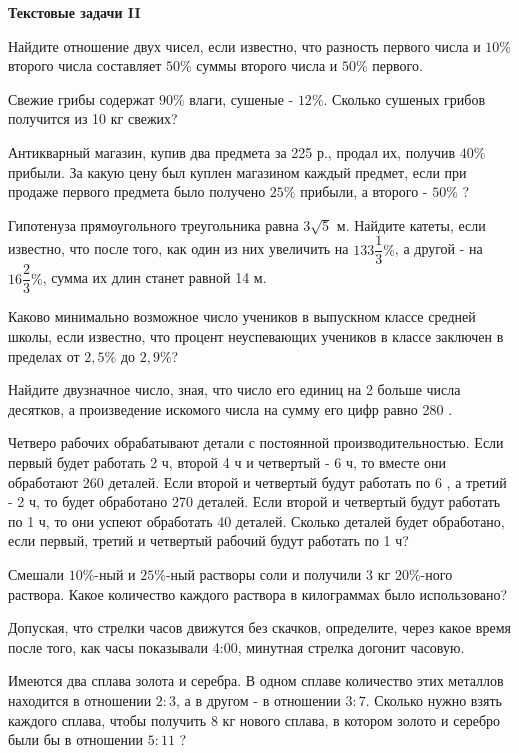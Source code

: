 \centerline{\bf \Huge Текстовые задачи II}

 Найдите отношение двух чисел, если известно, что разность первого числа и $10 \%$ второго числа составляет $50 \%$ суммы второго числа и $50 \%$ первого.

 Свежие грибы содержат $90 \%$ влаги, сушеные - $12 \%$. Сколько сушеных грибов получится из 10 кг свежих?

 Антикварный магазин, купив два предмета за 225 р., продал их, получив $40 \%$ прибыли. За какую цену был куплен магазином каждый предмет, если при продаже первого предмета было получено $25 \%$ прибыли, а второго - $50 \%$ ?

 Гипотенуза прямоугольного треугольника равна $3 \sqrt{ 5}$ м. Найдите катеты, если известно, что после того, как один из них увеличить на $133 \dfrac{1}{3} \%$, а другой - на $16 \dfrac{2}{3} \%$, сумма их длин станет равной 14 м.

 Каково минимально возможное число учеников в выпускном классе средней школы, если известно, что процент неуспевающих учеников в классе заключен в пределах от $2,5 \%$ до $2,9\%$?

 Найдите двузначное число, зная, что число его единиц на 2 больше числа десятков, а произведение искомого числа на сумму его цифр равно 280 .



 Четверо рабочих обрабатывают детали с постоянной производительностью. Если первый будет работать 2 ч, второй 4 ч и четвертый - 6 ч, то вместе они обработают 260 деталей. Если второй и четвертый будут работать по 6 , а третий - 2 ч, то будет обработано 270 деталей. Если второй и четвертый будут работать по 1 ч, то они успеют обработать 40 деталей. Сколько деталей будет обработано, если первый, третий и четвертый рабочий будут работать по 1 ч?

 Смешали $10 \%$-ный и $25 \%$-ный растворы соли и получили 3 кг $20\%$-ного раствора. Какое количество каждого раствора в килограммах было использовано?

 Допуская, что стрелки часов движутся без скачков, определите, через какое время после того, как часы показывали 4:00, минутная стрелка догонит часовую.

 Имеются два сплава золота и серебра. В одном сплаве количество этих металлов находится в отношении $2: 3$, а в другом - в отношении $3: 7$. Сколько нужно взять каждого сплава, чтобы получить 8 кг нового сплава, в котором золото и серебро были бы в отношении $5: 11$ ?

